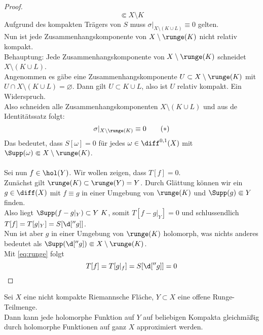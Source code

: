 \begin{proof}
\[   \Subset X\setminus K
   \]
   Aufgrund des kompakten Trägers von $S$ muss $\sigma|_{X \setminus
     (K \cup L)} \equiv 0$ gelten. \\
   Nun ist jede Zusammenhangskomponente von $X \setminus \runge(K)$
   nicht relativ kompakt. \\
   Behauptung: Jede Zusammenhangskomponente von $X \setminus
   \runge(K)$ schneidet $X \setminus (K \cup L)$. \\
   Angenommen es gäbe eine Zusammenhangskomponente $U \subset X
   \setminus \runge(K)$ mit $U \cap X \setminus ( K \cup L) =
   \varnothing$. Dann gilt $U \subset K \cup L$, also ist $U$ relativ
   kompakt. Ein Widerspruch. \\
   Also schneiden alle Zusammenhangskomponenten $X \setminus (K \cup
   L)$ und aus de Identitätssatz folgt:
   \[
   \sigma|_{X \setminus \runge(K)} \equiv 0 \label{eq:runge}\tag{$\ast$}
   \]
   Das bedeutet, dass $S[\omega] = 0$ für jedes $\omega \in
   \diff^{0,1}(X)$ mit $\Supp(\omega) \Subset X \setminus
   \runge(K)$.\\
   \\
   Sei nun $f \in \hol(Y)$. Wir wollen zeigen, dass $T[f] = 0$. \\
   Zunächst gilt $\runge(K) \subset \runge(Y) = Y$. Durch Glättung
   können wir ein $g \in \diff(X)$ mit $f \equiv g$ in einer Umgebung
   von $\runge(K)$ und $\Supp(g) \Subset Y$ finden. \\
   Also liegt $\Supp(f - g|_Y) \subset Y \ K$, somit $T[f- g|_Y] = 0$
   und schlussendlich $T[f] = T[g|_Y] = S[\d[''g]]$. \\
   Nun ist aber $g$ in einer Umgebung von $\runge(K)$ holomorph, was
   nichts anderes bedeutet als $\Supp(\d[''g]) \Subset X \setminus
   \runge(K)$. \\
   Mit \eqref{eq:runge} folgt
   \[
   T[f] = T[g|_f] = S[\d[''g]] = 0
   \]
\end{proof}

\begin{thm}
  Sei $X$ eine nicht kompakte Riemannsche Fläche, $Y \subset X$ eine
  offene Runge-Teilmenge. \\
  Dann kann jede holomorphe Funktion auf $Y$ auf beliebigen Kompakta
  gleichmäßig durch holomorphe Funktionen auf ganz $X$ approximiert werden.
\end{thm}

